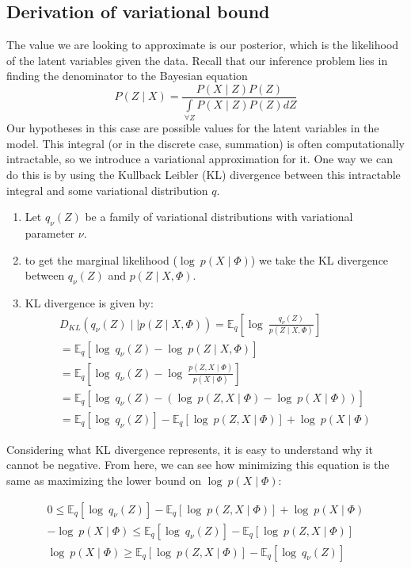 \subsection{Derivation of variational bound}

The value we are looking to approximate is our posterior, which is the
likelihood of the latent variables given the data. Recall that our
inference problem lies in finding the denominator to the Bayesian
equation
$$P(Z\mid X) = \frac{P(X\mid Z)P(Z)}{\int\limits_{\forall Z} P(X\mid Z) P(Z) dZ}$$
Our hypotheses in this case are possible values for the latent variables
in the model. This integral (or in the discrete case, summation) is often
computationally intractable, so we introduce a variational approximation for it. One way we can do this is by using the Kullback Leibler (KL) divergence between this intractable integral and some variational distribution $q$.\

\begin{enumerate}
\item Let $q_\nu(Z)$ be a family of variational distributions with variational parameter $\nu$.
\item to get the marginal likelihood ($\log\ p(X\mid \Phi)$) we take the KL divergence between $q_\nu(Z)$ and $p(Z\mid X,\Phi)$.
\item KL divergence is given by:
\begin{align}
\nonumber D_{KL}(q_\nu (Z) \mid \mid  p(Z\mid X,\Phi)) = \mathbb{E}_q[\log\ \frac{q_\nu(Z)}{p(Z\mid X,\Phi)}] \\
\nonumber  = \mathbb{E}_q [\log\ q_\nu(Z)- \log\ p(Z\mid X, \Phi)] \\
\nonumber  = \mathbb{E}_q [\log\ q_\nu(Z)- \log\ \frac{p(Z,X\mid \Phi)}{p(X\mid \Phi)}] \\
\nonumber  = \mathbb{E}_q [\log\ q_\nu(Z)- (\log\ p(Z,X\mid \Phi) - \log\ p(X\mid \Phi))] \\
 = \mathbb{E}_q [\log\ q_\nu(Z)] - \mathbb{E}_q [\log\ p(Z,X\mid \Phi)] + \log\ p(X\mid \Phi) 
\end{align}
\citep{blei:2006} 

\end{enumerate}
Considering what KL divergence represents, it is easy to understand why it cannot be negative. From here, we can see how minimizing this equation is the same as maximizing the lower bound on $\log\ p(X\mid \Phi)$:


\begin{align}
\nonumber 0 \leq \mathbb{E}_q [\log\ q_\nu(Z)] - \mathbb{E}_q [\log\ p(Z,X\mid \Phi)] + \log\ p(X\mid \Phi)\\
\nonumber - \log\ p(X\mid \Phi) \leq \mathbb{E}_q [\log\ q_\nu(Z)] - \mathbb{E}_q [\log\ p(Z,X\mid \Phi)]  \\
\log\ p(X\mid \Phi) \geq \mathbb{E}_q [\log\ p(Z,X\mid \Phi)] - \mathbb{E}_q [\log\ q_\nu(Z)] 
\end{align}

